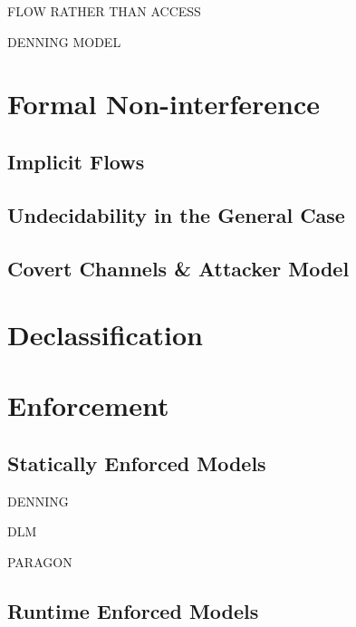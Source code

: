 FLOW RATHER THAN ACCESS

DENNING MODEL

\section{Formal Non-interference}

	\subsection{Implicit Flows}
	
	\subsection{Undecidability in the General Case}

	\subsection{Covert Channels \& Attacker Model}

\section{Declassification}

\section{Enforcement}

\subsection{Statically Enforced Models}

DENNING

DLM

PARAGON

\subsection{Runtime Enforced Models}




%
%


